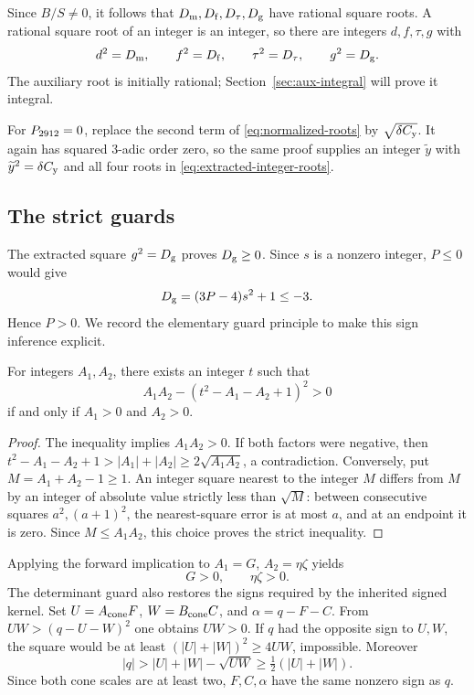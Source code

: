 Since $B/S\ne0$, it follows that $D_{\mathrm m},D_{\mathrm f},D_{\tau},D_{\mathrm g}$ have rational
square roots. A rational square root of an integer is an integer, so
there are integers $d,f,\tau,g$ with
\begin{equation}\label{eq:extracted-integer-roots}
 d^2=D_{\mathrm m},\qquad f^2=D_{\mathrm f},\qquad
 \tau^2=D_{\tau},\qquad g^2=D_{\mathrm g}.
\end{equation}
The auxiliary root is initially rational; Section~\ref{sec:aux-integral}
will prove it integral.

For $P_{2912}=0$, replace the second term of
\eqref{eq:normalized-roots} by $\sqrt{\delta C_{\mathrm y}}$. It again has
squared $3$-adic order zero, so the same proof supplies an integer
$\widetilde y$ with $\widetilde y^2=\delta C_{\mathrm y}$ and all four roots
in \eqref{eq:extracted-integer-roots}.

\subsection{The strict guards}

The extracted square $g^2=D_{\mathrm g}$ proves $D_{\mathrm g}\ge0$. Since $s$ is a
nonzero integer, $P\le0$ would give
\[
 D_{\mathrm g}=(3P-4)s^2+1\le-3.
\]
Hence $P>0$. We record the elementary guard principle to make this
sign inference explicit.

\begin{lemma}\label{lem:joint-positive}
For integers $A_1,A_2$, there exists an integer $t$ such that
\[
 A_1A_2-(t^2-A_1-A_2+1)^2>0
\]
if and only if $A_1>0$ and $A_2>0$.
\end{lemma}
\begin{proof}
The inequality implies $A_1A_2>0$. If both factors were negative, then
$t^2-A_1-A_2+1>|A_1|+|A_2|\ge2\sqrt{A_1A_2}$, a contradiction.
Conversely, put $M=A_1+A_2-1\ge1$. An integer square nearest to the
integer $M$ differs from $M$ by an integer of absolute value strictly
less than $\sqrt M$: between consecutive squares $a^2,(a+1)^2$, the
nearest-square error is at most $a$, and at an endpoint it is zero.
Since $M\le A_1A_2$, this choice proves the strict inequality.
\end{proof}

Applying the forward implication to $A_1=G$, $A_2=\eta\zeta$ yields
\begin{equation}\label{eq:strict-guards}
 G>0,\qquad \eta\zeta>0.
\end{equation}
The determinant guard also restores the signs required by the inherited
signed kernel. Set $U=A_{\mathrm{cone}} F$, $W=B_{\mathrm{cone}} C$, and
$\alpha=q-F-C$. From $UW>(q-U-W)^2$ one obtains $UW>0$. If $q$
had the opposite sign to $U,W$, the square would be at least
$(|U|+|W|)^2\ge4UW$, impossible. Moreover
\[
 |q|>|U|+|W|-\sqrt{UW}\ge\tfrac12(|U|+|W|).
\]
Since both cone scales are at least two, $F,C,\alpha$ have the same
nonzero sign as $q$.

